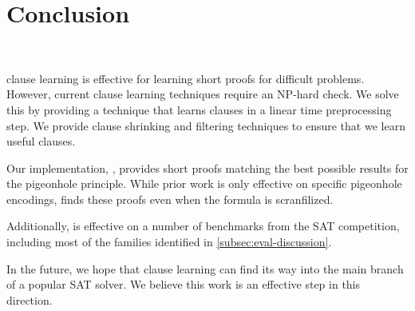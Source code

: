 \section{Conclusion}~\label{sec:conclusion}


\pr clause learning is effective for learning short proofs for 
difficult problems. However, current \pr clause learning techniques require
an NP-hard check. We solve this by providing a technique that learns \pr clauses
in a linear time preprocessing step. We provide clause shrinking and filtering 
techniques to ensure that we learn useful \pr clauses.

Our implementation, \tool, provides short \pr proofs matching the best possible results for 
the pigeonhole principle. While prior work is only effective on specific pigeonhole
encodings, \tool finds these proofs even when the formula is scranfilized.

Additionally, \tool is effective on a number of benchmarks from the SAT competition,
including most of the families identified in \autoref{subsec:eval-discussion}.

In the future, we hope that \pr clause learning can find its way into the main branch
of a popular SAT solver. We believe this work is an effective step in this direction.

